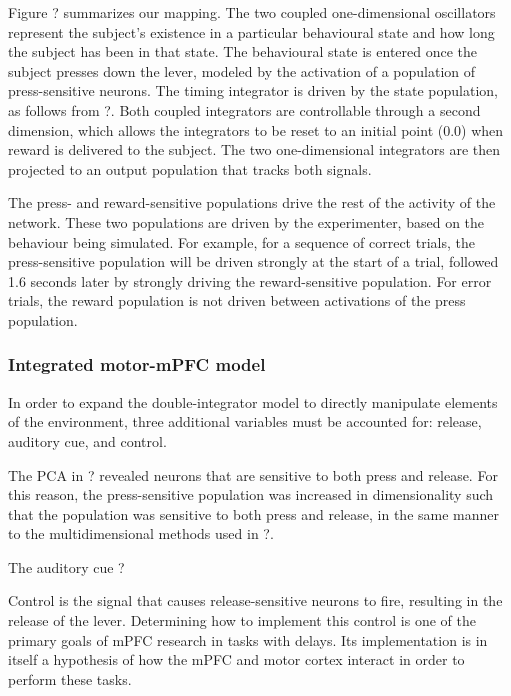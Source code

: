 \documentclass[12pt]{article}
\begin{document}
Figure ? %
summarizes our mapping.
The two coupled one-dimensional oscillators represent
the subject's existence in a particular behavioural state
and how long the subject has been in that state.
The behavioural state is entered
once the subject presses down the lever,
modeled by the activation
of a population of press-sensitive neurons.
The timing integrator is driven
by the state population, as follows from ?. %
Both coupled integrators are controllable
through a second dimension, %
which allows the integrators to be
reset to an initial point (0.0)
when reward is delivered to the subject.
The two one-dimensional integrators
are then projected to an output population that
tracks both signals.

The press- and reward-sensitive populations
drive the rest of the activity of the network.
These two populations are driven by the experimenter,
based on the behaviour being simulated.
For example, for a sequence of correct trials,
the press-sensitive population
will be driven strongly at the start of a trial,
followed 1.6 seconds later
by strongly driving the reward-sensitive population.
For error trials, the reward population
is not driven between activations of the press population.

\subsubsection{Integrated motor-mPFC model}

In order to expand the double-integrator model
to directly manipulate elements of the environment,
three additional variables must be accounted for:
release, auditory cue, and control.

The PCA in ? %
revealed
neurons that are sensitive to both press and release.
For this reason, the press-sensitive population
was increased in dimensionality
such that the population was sensitive
to both press and release,
in the same manner to the multidimensional
methods used in ?. %

The auditory cue ?

Control is the signal
that causes release-sensitive neurons to fire,
resulting in the release of the lever.
Determining how to implement this control
is one of the primary goals
of mPFC research in tasks with delays.
Its implementation is in itself
a hypothesis of how the mPFC and motor cortex interact
in order to perform these tasks.
\end{document}
